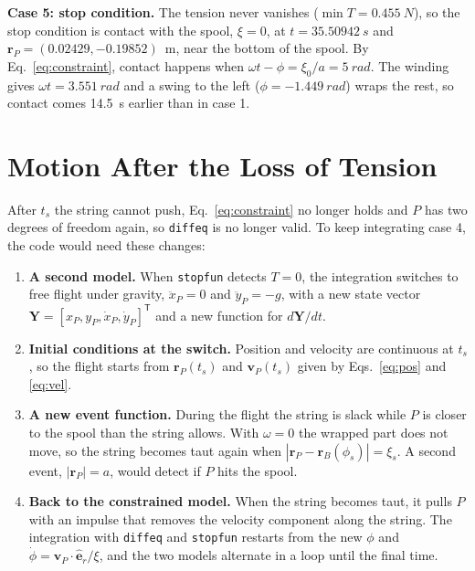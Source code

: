 \documentclass[11pt,a4paper]{article}
\numberwithin{equation}{section}
\newcommand{\er}{\hat{\mathbf{e}}_r}
\newcommand{\vect}[1]{\mathbf{#1}}
\begin{document}
\textbf{Case 5: stop condition.} The tension never vanishes ($\min T=\SI{0.455}{N}$), so the stop condition is contact with the spool, $\xi=0$, at $t=\SI{35.50942}{s}$ and $\vect r_P=(\num{0.02429},\num{-0.19852})$~\si{m}, near the bottom of the spool. By Eq.~\eqref{eq:constraint}, contact happens when $\omega t-\phi=\xi_0/a=\SI{5}{rad}$. The winding gives $\omega t=\SI{3.551}{rad}$ and a swing to the left ($\phi=\SI{-1.449}{rad}$) wraps the rest, so contact comes \SI{14.5}{s} earlier than in case 1.

\section{Motion After the Loss of Tension}\label{sec:slack}

After $t_s$ the string cannot push, Eq.~\eqref{eq:constraint} no longer holds and $P$ has two degrees of freedom again, so \texttt{diffeq} is no longer valid. To keep integrating case 4, the code would need these changes:
\begin{enumerate}[leftmargin=1.5em, itemsep=0.2em]
  \item \textbf{A second model.} When \texttt{stopfun} detects $T=0$, the integration switches to free flight under gravity, $\ddot x_P=0$ and $\ddot y_P=-g$, with a new state vector $\vect Y=[x_P,y_P,\dot x_P,\dot y_P]^{\mathsf T}$ and a new function for $d\vect Y/dt$.
  \item \textbf{Initial conditions at the switch.} Position and velocity are continuous at $t_s$, so the flight starts from $\vect r_P(t_s)$ and $\vect v_P(t_s)$ given by Eqs.~\eqref{eq:pos} and \eqref{eq:vel}.
  \item \textbf{A new event function.} During the flight the string is slack while $P$ is closer to the spool than the string allows. With $\omega=0$ the wrapped part does not move, so the string becomes taut again when $|\vect r_P-\vect r_B(\phi_s)|=\xi_s$. A second event, $|\vect r_P|=a$, would detect if $P$ hits the spool.
  \item \textbf{Back to the constrained model.} When the string becomes taut, it pulls $P$ with an impulse that removes the velocity component along the string. The integration with \texttt{diffeq} and \texttt{stopfun} restarts from the new $\phi$ and $\dot\phi=\vect v_P\cdot\er/\xi$, and the two models alternate in a loop until the final time.
\end{enumerate}
\end{document}
